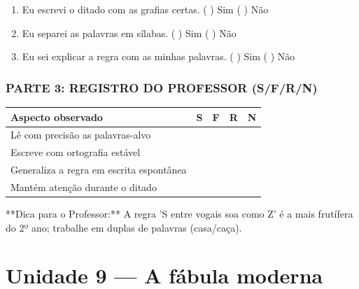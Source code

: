\begin{exercicio}
\begin{enumerate}[label=\alph*)]
  \item Eu escrevi o ditado com as grafias certas.  \quad ( ) Sim   ( ) Não

  \item Eu separei as palavras em sílabas.  \quad ( ) Sim   ( ) Não

  \item Eu sei explicar a regra com as minhas palavras.  \quad ( ) Sim   ( ) Não

\end{enumerate}

\subsection*{PARTE 3: REGISTRO DO PROFESSOR (S/F/R/N)}

\begin{center}
\renewcommand{\arraystretch}{1.4}
\begin{tabular}{@{}p{9cm}cccc@{}}
\toprule
Aspecto observado & S & F & R & N \\
\midrule
Lê com precisão as palavras-alvo & & & & \\
Escreve com ortografia estável & & & & \\
Generaliza a regra em escrita espontânea & & & & \\
Mantém atenção durante o ditado & & & & \\
\bottomrule\end{tabular}\end{center}

\end{exercicio}

\begin{dica}
**Dica para o Professor:** A regra 'S entre vogais soa como Z' é a mais frutífera do 2º ano; trabalhe em duplas de palavras (casa/caça).
\end{dica}


\chapter{Unidade 9 --- A fábula moderna}


